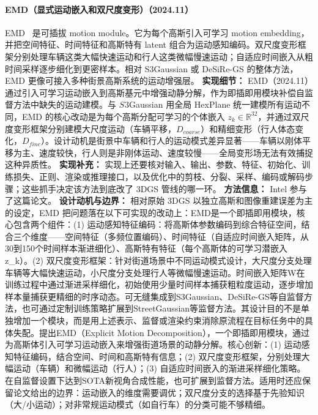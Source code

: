 \paragraph{EMD（显式运动嵌入和双尺度变形）（2024.11）}
EMD~\cite{2411_15582} 是可插拔 motion module。它为每个高斯引入可学习 motion embedding，并把空间特征、时间特征和高斯特有 latent 组合为运动感知编码。双尺度变形框架分别处理车辆这类大幅快速运动和行人这类微幅慢速运动；自适应时间嵌入从粗时间采样逐步细化到更密样本。相对 S3Gaussian 或 DeSiRe-GS 的整体方法，EMD 更像可接入多种街景高斯系统的运动增强层。
\textbf{实现细节：} EMD（2024.11） 通过引入可学习运动嵌入到高斯基元中增强动静分解，作为即插即用模块补偿自监督方法中缺失的运动建模。与 $S^{}3$Gaussian 用全局 HexPlane 统一建模所有运动不同，EMD 的核心改动是为每个高斯分配可学习的个体嵌入 $z_k \in \mathbb{R}^{32}$，并通过双尺度变形框架分别建模大尺度运动（车辆平移，$D_{coarse}$）和精细变形（行人体态变化，$D_{fine}$）。设计动机是街景中车辆和行人的运动模式差异显著——车辆以刚体平移为主、速度较快，行人则是非刚体运动、速度较慢——全局变形场无法有效捕捉这种异质性。
\textbf{实现补充：} 实现上还要核对输入、输出、参数、特征、初始化、训练损失、正则、渲染或推理接口，以及优化中的剪枝、分裂、采样、编码或解码步骤；这些抓手决定该方法到底改了 3DGS 管线的哪一环。
\textbf{方法信息：} Intel 参与了这篇论文。
\textbf{设计动机与边界：} 相对原始 3DGS 以独立高斯和图像重建误差为主的设定，EMD 把问题落在以下可实现的改动上：EMD是一个即插即用模块，核心包含两个组件：(1) 运动感知特征编码：将高斯体参数编码到综合特征空间，结合三个维度——空间特征（多频位置编码）、时间特征（自适应时间嵌入矩阵，从30到150个时间样本渐进细化）、高斯特有特征（每个高斯体的可学习潜嵌入z\_k）。(2) 双尺度变形框架：针对街道场景中不同运动模式设计，大尺度分支处理车辆等大幅快速运动，小尺度分支处理行人等微幅慢速运动。时间嵌入矩阵W在训练过程中通过渐进采样细化，初始使用少量时间样本捕获粗粒度运动，逐步增加样本量捕获更精细的时序动态。可无缝集成到S3Gaussian、DeSiRe-GS等自监督方法，也可通过定制训练策略扩展到StreetGaussian等监督方法。其设计目的不是单独增加一个模块，而是用上述表示、监督或渲染约束消除原流程在目标任务中的具体失配。提出EMD（Explicit Motion Decomposition），一个即插即用模块，通过为高斯体引入可学习运动嵌入来增强街道场景的动静分解。核心创新：(1) 运动感知特征编码，结合空间、时间和高斯特有信息；(2) 双尺度变形框架，分别处理大幅运动（车辆）和微幅运动（行人）；(3) 自适应时间嵌入的渐进采样细化策略。在自监督设置下达到SOTA新视角合成性能，也可扩展到监督方法。适用时还应保留论文给出的边界：运动嵌入的维度需要调优；双尺度分支的选择基于先验知识（大/小运动）；对非常规运动模式（如自行车）的分类可能不够精细。
